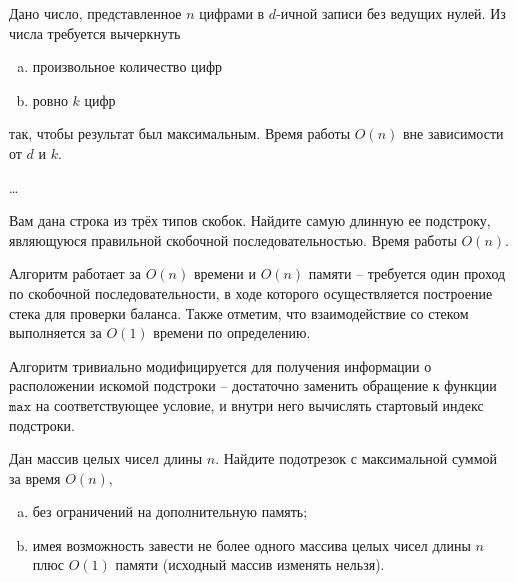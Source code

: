\begin{problem}
    Дано число, представленное $n$ цифрами в $d$-ичной записи без
    ведущих нулей.  Из числа требуется вычеркнуть
    \begin{enumerate}[(a)]
        \item произвольное количество цифр
        \item ровно $k$ цифр
    \end{enumerate}
    так, чтобы результат был максимальным. Время работы $O(n)$ вне зависимости от $d$ и $k$.
\end{problem}

\begin{solution}
    \dots
\end{solution}


\begin{problem}
    Вам дана строка из трёх типов скобок. Найдите самую длинную ее
    подстроку, являющуюся правильной скобочной последовательностью. Время работы $O(n)$.
\end{problem}

\begin{solution}
    \leavevmode\vspace{1pt}
    

    Алгоритм работает за \( O(n) \) времени и \( O(n) \) памяти -- требуется один проход по скобочной
    последовательности, в ходе которого осуществляется построение стека для проверки баланса.
    Также отметим, что взаимодействие со стеком выполняется за \( O(1) \) времени по определению.

    Алгоритм тривиально модифицируется для получения информации о расположении искомой подстроки --
    достаточно заменить обращение к функции $\mathtt{max}$ на соответствующее условие, и внутри него вычислять стартовый
    индекс подстроки.
\end{solution}


\begin{problem}
    Дан массив целых чисел длины $n$. Найдите подотрезок с максимальной суммой за время $O(n)$,
    \begin{enumerate}[(a)]
        \item без ограничений на дополнительную память;
        \item имея возможность завести не более одного массива целых чисел длины $n$ плюс $O(1)$ памяти (исходный массив изменять нельзя).
    \end{enumerate}
\end{problem}

